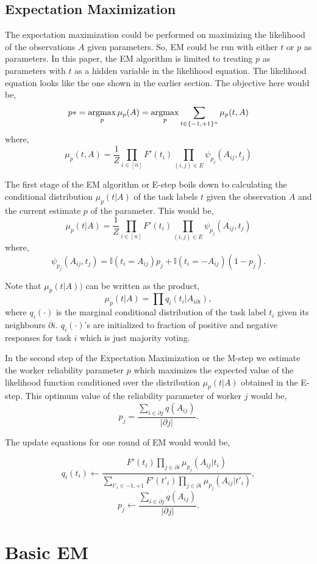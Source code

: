 \documentclass[10pt]{article}
\newcommand*{\argmax}{\operatornamewithlimits{argmax}\limits}
\DeclareMathOperator*{\argmax}{arg\,max}
\begin{document}
\subsection{Expectation Maximization} \label{init}
The expectation maximization could be performed on maximizing the likelihood of the observations $A$ given parameters. So, EM could be run with either $t$ or $p$ as parameters. In this paper, the EM algorithm is limited to treating $p$ as parameters with $t$ as a hidden variable in the likelihood equation. The likelihood equation looks like the one shown in the earlier section. The objective here would be,
$$p* = \argmax_p\mu_p(A) = \argmax_p\sum_{t\in\{-1,+1\}^n}\mu_p(t,A)$$
where, $$\mu_p(t,A) = \frac{1}{Z}\prod_{i\in [n]}{F'(t_i)}\prod_{(i,j)\in E}\psi_{p_j}(A_{ij},t_j)$$

The first stage of the EM algorithm or E-step boils down to calculating the conditional distribution $\mu_p(t\vert A)$ of the task labels $t$ given the observation $A$ and the current estimate $p$ of the parameter. This would be,
 $$\mu_p(t\vert A) = \frac{1}{Z}\prod_{i\in [n]}{F'(t_i)}\prod_{(i,j)\in E}\psi_{p_j}(A_{ij},t_j)$$
 where, $$\psi_{p_j}(A_{ij}, t_j) = \mathbb{I}(t_i=A_{ij})p_j + \mathbb{I}(t_i=-A_{ij})(1-p_j).$$
 
Note that $\mu_p(t\vert A))$ can be written as the product,
$$\mu_p(t\vert A) = \prod q_i(t_i \vert A_{i \partial i}),$$ where $q_i(\cdot)$ is the marginal conditional distribution of the task label $t_i$ given its neighbours $\partial i$. $q_i(\cdot)$'s are initialized to fraction of positive and negative responses for task $i$ which is just majority voting.

In the second step of the Expectation Maximization or the M-step we estimate the worker reliability parameter $p$ which maximizes the expected value of the likelihood function conditioned over the distribution $\mu_p(t \vert A)$ obtained in the E-step. This optimum value of the reliability parameter of worker $j$ would be,
$$p_j = \frac{\sum_{i\in \partial j}q(A_{ij})}{\vert\partial j\vert}.$$

The update equations for one round of EM would would be,
 
$$q_i(t_i) \leftarrow \frac{F'(t_i)\prod_{j\in \partial i} \mu_{p_j}(A_{ij}\vert t_i)}{\sum_{t'_i\in {-1,+1}}F'(t'_i)\prod_{j\in \partial i} \mu_{p_j}(A_{ij}\vert t'_i)},$$
$$p_j \leftarrow \frac{\sum_{i\in \partial j}q(A_{ij})}{\vert\partial j\vert}.$$

\section{Basic EM}
\end{document}
